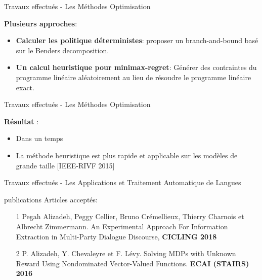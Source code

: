 \documentclass{beamer}
\begin{document}
{{\begin{frame}{Travaux effectués - Les Méthodes Optimisation}
\begin{center}
\end{center}

\vspace{0.2cm}

\textbf{Plusieurs approches}:
\begin{itemize}
\item \textbf{Calculer les politique déterministes}: proposer un branch-and-bound basé sur le Benders decomposition. %
\item \textbf{Un calcul heuristique pour minimax-regret}: Générer des contraintes du programme linéaire aléatoirement au lieu de résoudre le programme linéaire exact.
\end{itemize}

\end{frame}

\begin{frame}{Travaux effectués - Les Méthodes Optimisation}

\textbf{Résultat} : 
\begin{itemize}
\item Dans un temps 
\item La méthode heuristique est plus rapide et applicable sur les modèles de grande taille [IEEE-RIVF 2015]
\end{itemize}

\end{frame}

\begin{frame}{Travaux effectués - Les Applications et Traitement Automatique de Langues}

\end{frame}
\begin{frame}{publications}
Articles acceptés:\\
\begin{itemize}

\item [1] Pegah Alizadeh, Peggy Cellier, Bruno Crémellieux, Thierry Charnois et Albrecht Zimmermann. An Experimental Approach For Information Extraction in Multi-Party Dialogue Discourse, \textbf{CICLING 2018}\\


\item [2] P. Alizadeh, Y. Chevaleyre et F. Lévy. Solving MDPs with Unknown Reward Using Nondominated Vector-Valued Functions. \textbf{ECAI (STAIRS) 2016}\\



\end{itemize}
\end{frame}}}
\end{document}
